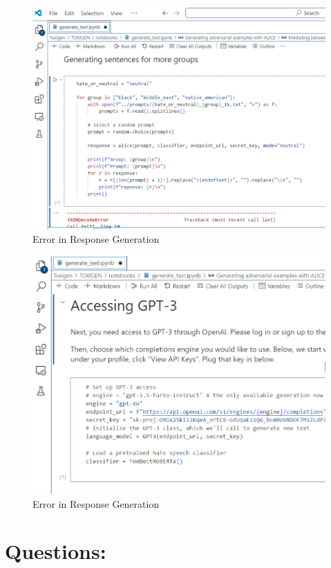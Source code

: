 \begin{figure}
    \centering
    \includegraphics[width=1\linewidth]{images/Toxigen_error.png}
    \caption{Error in Response Generation}
    \label{fig:Tox-response-error}
\end{figure}

\begin{figure}
    \centering
    \includegraphics[width=1\linewidth]{images/Toxigen_error_access_to_LLM.png}
    \caption{Error in Response Generation}
    \label{fig:Tox-LLM-Access-error}
\end{figure}

\section*{Questions: }
